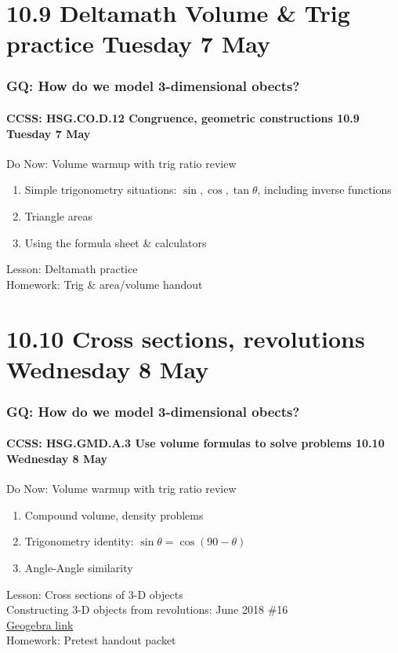 \documentclass{beamer}
\begin{document}
  \section{10.9 Deltamath Volume \& Trig practice Tuesday 7 May}
    \frame
    {
      \frametitle{GQ: How do we model 3-dimensional obects?}
      \framesubtitle{CCSS: HSG.CO.D.12 Congruence, geometric constructions \hfill \alert{10.9 Tuesday 7 May}}
        \begin{block}{Do Now: Volume warmup with trig ratio review}
          \begin{enumerate}
            \item Simple trigonometry situations: $\sin, \cos, \tan \theta$, including inverse functions
            \item Triangle areas
            \item Using the formula sheet \& calculators
        \end{enumerate}
        \end{block}
      Lesson: Deltamath practice \\[0.5cm]
      Homework: Trig \& area/volume handout
    }

  \section{10.10 Cross sections, revolutions Wednesday 8 May}
    \frame
    {
      \frametitle{GQ: How do we model 3-dimensional obects?}
      \framesubtitle{CCSS: HSG.GMD.A.3 Use volume formulas to solve problems \hfill \alert{10.10 Wednesday 8 May}}
      \begin{block}{Do Now: Volume warmup with trig ratio review}
        \begin{enumerate}
          \item Compound volume, density problems
          \item Trigonometry identity: $\sin \theta = \cos (90-\theta)$
          \item Angle-Angle similarity
      \end{enumerate}
      \end{block}
      Lesson: Cross sections of 3-D objects\\
      Constructing 3-D objects from revolutions: June 2018 \#16\\
      \href{https://www.geogebra.org/m/DV7ehzYt}{Geogebra link}\\[0.5cm]
      Homework: Pretest handout packet
    }
\end{document}
